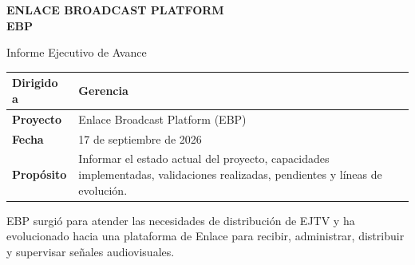 \thispagestyle{fancy}
\vspace*{18mm}
\begin{center}
{\color{Navy}\bfseries\fontsize{22}{27}\selectfont ENLACE BROADCAST PLATFORM\\[3pt] EBP}\par
\vspace{7mm}
{\color{Gray}\fontsize{12}{15}\selectfont Informe Ejecutivo de Avance}\par
\end{center}

\vspace{8mm}

\begin{tabularx}{\textwidth}{|L{0.24\textwidth}|Y|}\hline
\textbf{Dirigido a} & Gerencia \\ \hline
\textbf{Proyecto} & Enlace Broadcast Platform (EBP) \\ \hline
\textbf{Fecha} & 17 de septiembre de 2026 \\ \hline
\textbf{Propósito} & Informar el estado actual del proyecto, capacidades implementadas, validaciones realizadas, pendientes y líneas de evolución. \\ \hline
\end{tabularx}

\vspace{9mm}

\begin{callout}
EBP surgió para atender las necesidades de distribución de EJTV y ha evolucionado hacia una plataforma de Enlace para recibir, administrar, distribuir y supervisar señales audiovisuales.
\end{callout}

\newpage

